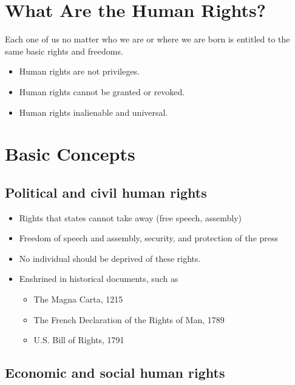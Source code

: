 \documentclass[
]{book}
\begin{document}
\hypertarget{what-are-the-human-rights}{%
\section{What Are the Human Rights?}\label{what-are-the-human-rights}}

Each one of us no matter who we are or where we are born is entitled to the same basic rights and freedoms.

\begin{itemize}
\item
  Human rights are not privileges.
\item
  Human rights cannot be granted or revoked.
\item
  Human rights inalienable and universal.
\end{itemize}

\hypertarget{basic-concepts}{%
\section{Basic Concepts}\label{basic-concepts}}

\hypertarget{political-and-civil-human-rights}{%
\subsection{Political and civil human rights}\label{political-and-civil-human-rights}}

\begin{itemize}
\item
  Rights that states cannot take away (free speech, assembly)
\item
  Freedom of speech and assembly, security, and protection of the press
\item
  No individual should be deprived of these rights.
\item
  Enshrined in historical documents, such as

  \begin{itemize}
  \item
    The Magna Carta, 1215
  \item
    The French Declaration of the Rights of Man, 1789
  \item
    U.S. Bill of Rights, 1791
  \end{itemize}
\end{itemize}

\hypertarget{economic-and-social-human-rights}{%
\subsection{Economic and social human rights}\label{economic-and-social-human-rights}}
\end{document}
